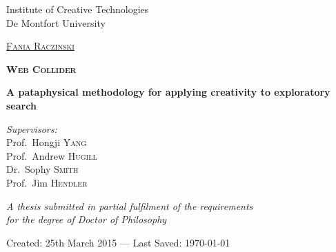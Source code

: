 
\begin{titlepage}
\begin{center}

Institute of Creative Technologies\\
De Montfort University

\vspace{2cm}

\textsc{\huge \href{http://fania.uk}{Fania Raczinski}}

\vspace{2cm}


\textsc{\Huge \bfseries Web Collider}

\vspace{1.5cm}

{\huge \bfseries A pataphysical methodology for applying creativity to exploratory search}

\vspace{2cm}

\emph{Supervisors:}\\
{Prof.\ Hongji \textsc{Yang}}\\
{Prof.\ Andrew \textsc{Hugill}}\\
{Dr.\ Sophy \textsc{Smith}}\\
{Prof.\ Jim \textsc{Hendler}}

\vspace{1.5cm}

\large \textit{A thesis submitted in partial fulfilment of the requirements\\ for the degree of Doctor of Philosophy}

\vfill

Created: {25th March 2015} --- Last Saved: {\today}\\

\end{center}
\end{titlepage}
